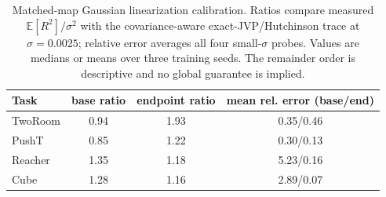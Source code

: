 \begin{table}[t]
\centering
\caption{Matched-map Gaussian linearization calibration. Ratios compare measured $\mathbb{E}[R^2]/\sigma^2$ with the covariance-aware exact-JVP/Hutchinson trace at $\sigma=0.0025$; relative error averages all four small-$\sigma$ probes. Values are medians or means over three training seeds. The remainder order is descriptive and no global guarantee is implied.}
\label{tab:linearization-calibration}
\small
\setlength{\tabcolsep}{4pt}
\begin{tabular}{lccc}
\toprule
Task & base ratio & endpoint ratio & mean rel. error (base/end) \\
\midrule
TwoRoom & 0.94 & 1.93 & 0.35/0.46 \\
PushT & 0.85 & 1.22 & 0.30/0.13 \\
Reacher & 1.35 & 1.18 & 5.23/0.16 \\
Cube & 1.28 & 1.16 & 2.89/0.07 \\
\bottomrule
\end{tabular}
\end{table}
